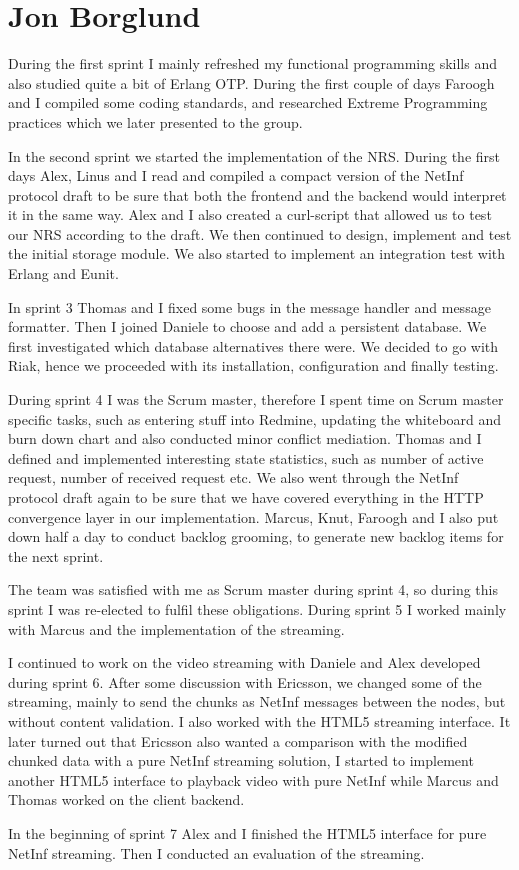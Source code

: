 \section{Jon Borglund}
During the first sprint I mainly refreshed my functional programming skills and also studied quite a bit of Erlang OTP.
During the first couple of days Faroogh and I compiled some coding standards, and researched Extreme Programming practices which we later presented to the group.

In the second sprint we started the implementation of the NRS. During the first days Alex, Linus and I read and compiled a compact version of the NetInf protocol draft to be sure that both the frontend and the backend would interpret it in the same way. Alex and I also created a curl-script that allowed us to test our NRS according to the draft. 
We then continued to design, implement and test the initial storage module. 
We also started to implement an integration test with Erlang and Eunit.

In sprint 3 Thomas and I fixed some bugs in the message handler and message formatter. Then I joined Daniele to choose and add a persistent database. We first investigated which database alternatives there were. We decided to go with Riak, hence we proceeded with its installation, configuration and finally testing.

During sprint 4 I was the Scrum master, therefore I spent time on Scrum master specific tasks, such as entering stuff into Redmine, updating the whiteboard and burn down chart and also conducted minor conflict mediation. 
Thomas and I defined and implemented interesting state statistics, such as number of active request, number of received request etc. We also went through the NetInf protocol draft again to be sure that we have covered everything in the HTTP convergence layer in our implementation. Marcus, Knut, Faroogh and I also put down half a day to conduct backlog grooming, to generate new backlog items for the next sprint. 

The team was satisfied with me as Scrum master during sprint 4, so during this sprint I was re-elected to fulfil these obligations. 
During sprint 5 I worked mainly with Marcus and the implementation of the streaming. 

I continued to work on the video streaming with Daniele and Alex developed during sprint 6. After some discussion with Ericsson, we changed some of the streaming, mainly to send the chunks as NetInf messages between the nodes, but without content validation. I also worked with the HTML5 streaming interface. 
It later turned out that Ericsson also wanted a comparison with the modified chunked data with a pure NetInf streaming solution, I started to implement another HTML5 interface to playback video with pure NetInf while Marcus and Thomas worked on the client backend.

In the beginning of sprint 7 Alex and I finished the HTML5 interface for pure NetInf streaming. Then I conducted an evaluation of the streaming. 
